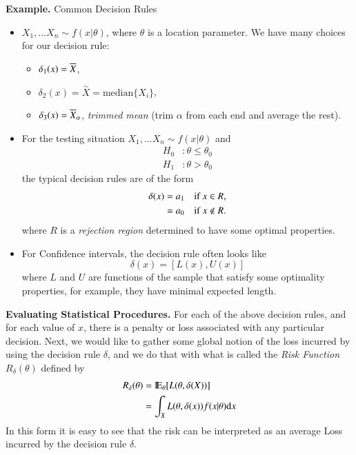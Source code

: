 \documentclass[captions=tableheading]{scrbook}
\begin{document}
\textbf{Example.} Common Decision Rules

\begin{itemize}
\item $X_{1},\ldots X_{n}\sim f(x|\theta)$, where $\theta$ is a location parameter. We have many choices for our decision rule:
\begin{itemize}
\item $\delta_{1}(x)=\overline{X}$,
\item $\delta_{2}(x)=\overset{\sim}{X}=\mathrm{median}\{X_{i}\}$,
\item $\delta_{3}(x)=\overline{X}_{\alpha}$, \emph{trimmed mean} (trim $\alpha$ from each end and average the rest).
\end{itemize}
\item For the testing situation \(X_{1},\ldots X_{n}\sim f(x|\theta)\) and
   \begin{align*}
   H_{0} & :\theta \leq \theta_{0}\\
   H_{1} & :\theta > \theta_{0}
   \end{align*}
   the typical decision rules are of the form 
   \begin{align*}
   \delta(x) & =a_{1}\quad\mbox{if \ensuremath{x\in R},}\\
   & =a_{0}\quad\mbox{if \ensuremath{x\notin R}.}
   \end{align*}
   where $R$ is a \emph{rejection region} determined to have some optimal properties.
\item For Confidence intervals, the decision rule often looks like 
   \[
   \delta(x)=[L(x),U(x)]
   \]
   where $L$ and $U$ are functions of the sample that satisfy some optimality properties, for example, they have minimal expected length.
\end{itemize}
\textbf{Evaluating Statistical Procedures.} For each of the above decision rules, and for each value of $x$, there is a penalty or loss associated with any particular decision. Next, we would like to gather some global notion of the loss incurred by using the decision rule $\delta$, and we do that with what is called the \emph{Risk Function} $R_{\delta}(\theta)$ defined by 
\begin{align*}
R_{\delta}(\theta) & =\mathrm{I\hspace{-1.5pt}E}_{\theta}[L(\theta,\delta(X))]\\
 & =\int_{\mathfrak{X}}L(\theta,\delta(x))f(x|\theta)\mathrm{d} x
\end{align*}
In this form it is easy to see that the risk can be interpreted as an average Loss incurred by the decision rule $\delta$.
\end{document}
